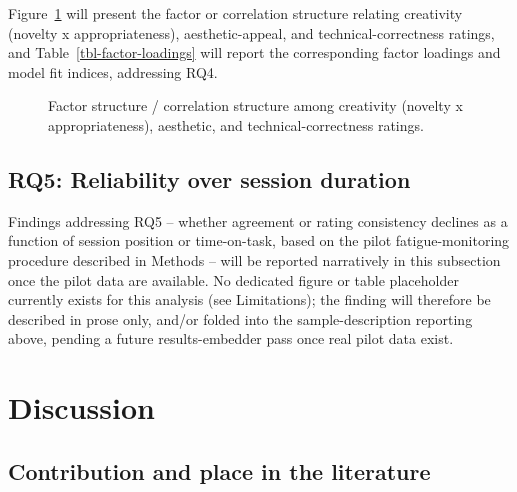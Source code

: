 \documentclass[
  12pt,
]{article}
\begin{document}
Figure~\ref{fig-factor-structure} will present the factor or correlation
structure relating creativity (novelty x appropriateness),
aesthetic-appeal, and technical-correctness ratings, and
Table~\ref{tbl-factor-loadings} will report the corresponding factor
loadings and model fit indices, addressing RQ4.

\begin{figure}

\centering{

}

\caption{\label{fig-factor-structure}Factor structure / correlation
structure among creativity (novelty x appropriateness), aesthetic, and
technical-correctness ratings.}

\end{figure}%

\begin{table}

\caption{\label{tbl-factor-loadings}Factor loadings and fit indices for
the proposed factor model relating creativity, aesthetic appeal, and
technical correctness dimensions.}

\centering{

}

\end{table}%

\subsection{RQ5: Reliability over session
duration}\label{rq5-reliability-over-session-duration}

Findings addressing RQ5 -- whether agreement or rating consistency
declines as a function of session position or time-on-task, based on the
pilot fatigue-monitoring procedure described in Methods -- will be
reported narratively in this subsection once the pilot data are
available. No dedicated figure or table placeholder currently exists for
this analysis (see Limitations); the finding will therefore be described
in prose only, and/or folded into the sample-description reporting
above, pending a future results-embedder pass once real pilot data
exist.

\section{Discussion}\label{discussion}

\subsection{Contribution and place in the
literature}\label{contribution-and-place-in-the-literature}
\end{document}
